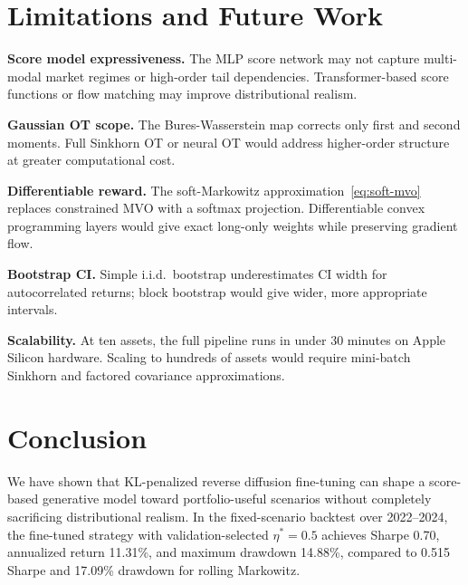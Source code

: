\documentclass{article}
\begin{document}
\section{Limitations and Future Work}
\label{sec:limitations}

\textbf{Score model expressiveness.} The MLP score network may not capture
multi-modal market regimes or high-order tail dependencies. Transformer-based score
functions \citep{dhariwal2021diffusion} or flow matching \citep{lipman2023flow}
may improve distributional realism.

\textbf{Gaussian OT scope.} The Bures-Wasserstein map corrects only first and
second moments. Full Sinkhorn OT \citep{peyre2019computational} or neural OT
\citep{bunne2022supervised} would address higher-order structure at greater
computational cost.

\textbf{Differentiable reward.} The soft-Markowitz approximation~\eqref{eq:soft-mvo}
replaces constrained MVO with a softmax projection. Differentiable convex
programming layers \citep{agrawal2019differentiable} would give exact long-only
weights while preserving gradient flow.

\textbf{Bootstrap CI.} Simple i.i.d.\ bootstrap underestimates CI width for
autocorrelated returns; block bootstrap \citep{politis1994stationary} would give
wider, more appropriate intervals.

\textbf{Scalability.} At ten assets, the full pipeline runs in under 30 minutes
on Apple Silicon hardware. Scaling to hundreds of assets would require
mini-batch Sinkhorn \citep{fatras2021unbalanced} and factored covariance
approximations.

\section{Conclusion}
\label{sec:conclusion}

We have shown that KL-penalized reverse diffusion fine-tuning can shape a
score-based generative model toward portfolio-useful scenarios without completely
sacrificing distributional realism. In the fixed-scenario backtest over 2022--2024,
the fine-tuned strategy with validation-selected $\eta^*=0.5$ achieves Sharpe 0.70,
annualized return 11.31\%, and maximum drawdown 14.88\%, compared to 0.515 Sharpe
and 17.09\% drawdown for rolling Markowitz.
\end{document}
